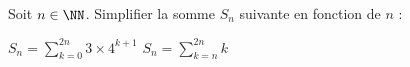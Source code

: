 %
%
Soit $n \in \NN$. Simplifier la somme $S_n$ suivante en fonction de $n$ :
	\begin{tasks}
		\task $S_n=\sum\limits_{k=0}^{2n} 3\times 4^{k+1}$
		\task $S_n=\sum\limits_{k=n}^{2n} k$
	\end{tasks}
